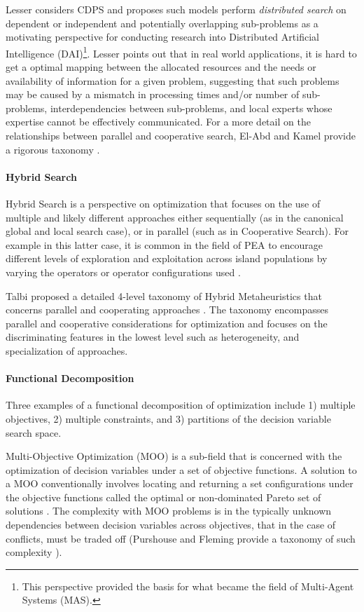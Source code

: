 Lesser \cite{Lesser1990} considers CDPS and proposes such models perform \emph{distributed search} on dependent or independent and potentially overlapping sub-problems as a motivating perspective for conducting research into Distributed Artificial Intelligence (DAI)\footnote{This perspective provided the basis for what became the field of Multi-Agent Systems (MAS).}. Lesser points out that in real world applications, it is hard to get a optimal mapping between the allocated resources and the needs or availability of information for a given problem, suggesting that such problems may be caused by a mismatch in processing times and/or number of sub-problems, interdependencies between sub-problems, and local experts whose expertise cannot be effectively communicated. For a more detail on the relationships between parallel and cooperative search, El-Abd and Kamel provide a rigorous taxonomy \cite{El-Abd2005}.
	
\paragraph{Hybrid Search}
Hybrid Search is a perspective on optimization that focuses on the use of multiple and likely different approaches either sequentially (as in the canonical global and local search case), or in parallel (such as in Cooperative Search). For example in this latter case, it is common in the field of PEA to encourage different levels of exploration and exploitation across island populations by varying the operators or operator configurations used \cite{Tanese1989, Adamidis1996}. 

Talbi proposed a detailed 4-level taxonomy of Hybrid Metaheuristics that concerns parallel and cooperating approaches \cite{Talbi2001}. The taxonomy encompasses parallel and cooperative considerations for optimization and focuses on the discriminating features in the lowest level such as heterogeneity, and specialization of approaches.
	
\paragraph{Functional Decomposition}
Three examples of a functional decomposition of optimization include 1) multiple objectives, 2) multiple constraints, and 3) partitions of the decision variable search space. 

Multi-Objective Optimization (MOO) is a sub-field that is concerned with the optimization of decision variables under a set of objective functions. A solution to a MOO conventionally involves locating and returning a set configurations under the objective functions called the optimal or non-dominated Pareto set of solutions \cite{Deb2001}. The complexity with MOO problems is in the typically unknown dependencies between decision variables across objectives, that in the case of conflicts, must be traded off (Purshouse and Fleming provide a taxonomy of such complexity \cite{Purshouse2003}). 


